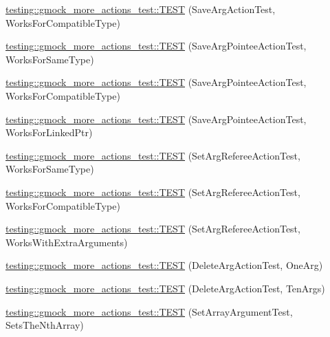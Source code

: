 \begin{DoxyCompactItemize}
\hyperlink{namespacetesting_1_1gmock__more__actions__test_a2b92b573de73fdf97dad4da8a67d7fc0}{testing\+::gmock\+\_\+more\+\_\+actions\+\_\+test\+::\+T\+E\+ST} (Save\+Arg\+Action\+Test, Works\+For\+Compatible\+Type)
\item 
\hyperlink{namespacetesting_1_1gmock__more__actions__test_a51d471708cb6fa3c403ea1d936a49dc1}{testing\+::gmock\+\_\+more\+\_\+actions\+\_\+test\+::\+T\+E\+ST} (Save\+Arg\+Pointee\+Action\+Test, Works\+For\+Same\+Type)
\item 
\hyperlink{namespacetesting_1_1gmock__more__actions__test_a35b74b32b6a222e048706e6ce8d64118}{testing\+::gmock\+\_\+more\+\_\+actions\+\_\+test\+::\+T\+E\+ST} (Save\+Arg\+Pointee\+Action\+Test, Works\+For\+Compatible\+Type)
\item 
\hyperlink{namespacetesting_1_1gmock__more__actions__test_afc168d80fe8ca16f0efc874587574e64}{testing\+::gmock\+\_\+more\+\_\+actions\+\_\+test\+::\+T\+E\+ST} (Save\+Arg\+Pointee\+Action\+Test, Works\+For\+Linked\+Ptr)
\item 
\hyperlink{namespacetesting_1_1gmock__more__actions__test_aa9fa575b30dca09e9886722b78415a22}{testing\+::gmock\+\_\+more\+\_\+actions\+\_\+test\+::\+T\+E\+ST} (Set\+Arg\+Referee\+Action\+Test, Works\+For\+Same\+Type)
\item 
\hyperlink{namespacetesting_1_1gmock__more__actions__test_af5a15dbcba14010a5463f3ac9451ab8a}{testing\+::gmock\+\_\+more\+\_\+actions\+\_\+test\+::\+T\+E\+ST} (Set\+Arg\+Referee\+Action\+Test, Works\+For\+Compatible\+Type)
\item 
\hyperlink{namespacetesting_1_1gmock__more__actions__test_a0ea4f3d8f1a643726e37825c58d8741f}{testing\+::gmock\+\_\+more\+\_\+actions\+\_\+test\+::\+T\+E\+ST} (Set\+Arg\+Referee\+Action\+Test, Works\+With\+Extra\+Arguments)
\item 
\hyperlink{namespacetesting_1_1gmock__more__actions__test_a575e9a6f5bfcc133188e973147697425}{testing\+::gmock\+\_\+more\+\_\+actions\+\_\+test\+::\+T\+E\+ST} (Delete\+Arg\+Action\+Test, One\+Arg)
\item 
\hyperlink{namespacetesting_1_1gmock__more__actions__test_a972b47a7e96b95606190afa928ea2db4}{testing\+::gmock\+\_\+more\+\_\+actions\+\_\+test\+::\+T\+E\+ST} (Delete\+Arg\+Action\+Test, Ten\+Args)
\item 
\hyperlink{namespacetesting_1_1gmock__more__actions__test_aacf568e3d16b210aa2316ccc2cb6b22d}{testing\+::gmock\+\_\+more\+\_\+actions\+\_\+test\+::\+T\+E\+ST} (Set\+Array\+Argument\+Test, Sets\+The\+Nth\+Array)
\item 

\end{DoxyCompactItemize}
